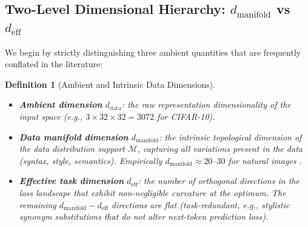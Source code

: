 \documentclass[11pt, a4paper]{article}
\newtheorem{dfn}[theo]{Definition}
\theoremstyle{plain}
\begin{document}
\subsection{Two-Level Dimensional Hierarchy: $d_{\mathrm{manifold}}$ vs $d_{\mathrm{eff}}$}
\label{sec:two_level_dims}

We begin by strictly distinguishing three ambient quantities that are frequently conflated in the literature:

\begin{dfn}[Ambient and Intrinsic Data Dimensions]
\label{dfn:ambient_dims}
\begin{itemize}
    \item \textbf{Ambient dimension} $d_{\mathrm{data}}$: the raw representation dimensionality of the input space (e.g., $3 \times 32 \times 32 = 3072$ for CIFAR-10).
    \item \textbf{Data manifold dimension} $d_{\mathrm{manifold}}$: the intrinsic topological dimension of the data distribution support $\mathcal{M}$, capturing all variations present in the data (syntax, style, semantics). Empirically $d_{\mathrm{manifold}} \approx 20$--$30$ for natural images \citep{pope2021efficient}.
    \item \textbf{Effective task dimension} $d_{\mathrm{eff}}$: the number of orthogonal directions in the loss landscape that exhibit non-negligible curvature at the optimum. The remaining $d_{\mathrm{manifold}} - d_{\mathrm{eff}}$ directions are \emph{flat} (task-redundant, e.g., stylistic synonym substitutions that do not alter next-token prediction loss).
\end{itemize}
\end{dfn}
\end{document}
